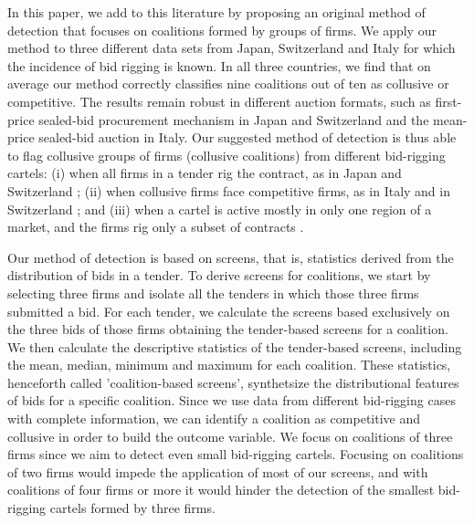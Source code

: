 \documentclass[a4paper,11pt]{article}
\begin{document}
	In this paper, we add to this literature by proposing an original method of detection that focuses on coalitions formed by groups of firms. We apply our method to three different data sets from Japan, Switzerland and Italy for which the incidence of bid rigging is known. In all three countries, we find that on average our method correctly classifies nine coalitions out of ten as collusive or competitive. The results remain robust in different auction formats, such as first-price sealed-bid procurement mechanism in Japan and Switzerland and the mean-price sealed-bid auction in Italy. Our suggested method of detection is thus able to flag collusive groups of firms (collusive coalitions) from different bid-rigging cartels: (i) when all firms in a tender rig the contract, as in Japan and Switzerland \citep[][]{ishii2014bid,huber2019machine,imhof2019detecting}; (ii) when collusive firms face competitive firms, as in Italy and in Switzerland \citep[see][]{conley2016detecting,wallimann2020machine}; and (iii) when a cartel is active mostly in only one region of a market, and the firms rig only a subset of contracts \citep[see][]{imhof2018screening}. 
	
	Our method of detection is based on screens, that is, statistics derived from the distribution of bids in a tender. To derive screens for coalitions, we start by selecting three firms and isolate all the tenders in which those three firms submitted a bid. For each tender, we calculate the screens based exclusively on the three bids of those firms obtaining the tender-based screens for a coalition. We then calculate the descriptive statistics of the tender-based screens, including the mean, median, minimum and maximum for each coalition. These statistics, henceforth called 'coalition-based screens', synthetsize the distributional features of bids for a specific coalition. Since we use data from different bid-rigging cases with complete information, we can identify a coalition as competitive and collusive in order to build the outcome variable. We focus on coalitions of three firms since we aim to detect even small bid-rigging cartels. Focusing on coalitions of two firms would impede the application of most of our screens, and with coalitions of four firms or more it would hinder the detection of the smallest bid-rigging cartels formed by three firms. 
	
\end{document}
